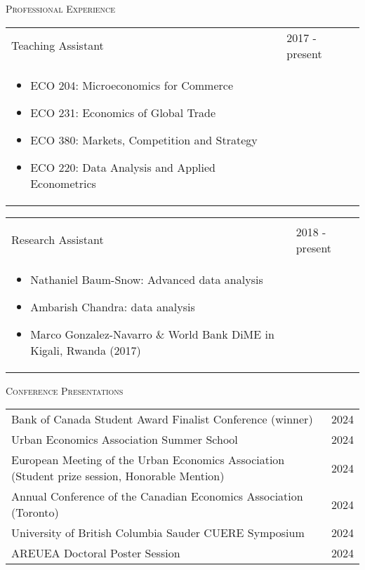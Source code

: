 \documentclass[11pt]{amsart}
\begin{document}
\vspace{0.4cm}

\LARGE
\textsc{Professional Experience}
\vspace{0.2cm}
\normalsize

\begin{tabular}{ p{12.5cm} p{5cm}}
Teaching Assistant & 2017 - present \\
\begin{itemize}
  \item ECO 204: Microeconomics for Commerce
  \item ECO 231: Economics of Global Trade
  \item ECO 380: Markets, Competition and Strategy
  \item ECO 220: Data Analysis and Applied Econometrics
\end{itemize} 
                   &                
\end{tabular}

\begin{tabular}{ p{12.5cm} p{5cm}}
                   &             \\
Research Assistant & 2018 - present \\
\begin{itemize}
  \item Nathaniel Baum-Snow: Advanced data analysis 
  \item Ambarish Chandra: data analysis
  \item Marco Gonzalez-Navarro \& World Bank DiME in Kigali, Rwanda (2017)
\end{itemize}      &             


\end{tabular}





\normalsize

\vspace{0.4cm}
\LARGE
\textsc{Conference Presentations}
\vspace{0.2cm}
\normalsize

\begin{tabular}{ p{12.5cm} p{5cm}}
Bank of Canada Student Award Finalist Conference (winner) & 2024 \\	
Urban Economics Association Summer School & 2024 \\	
European Meeting of the Urban Economics Association (Student prize session, Honorable Mention) &				 2024 \\
Annual Conference of the Canadian Economics Association (Toronto)     & 2024 \\
University of British Columbia Sauder CUERE Symposium                   & 2024 \\
AREUEA Doctoral Poster Session & 2024 \\
\end{tabular}
\end{document}
